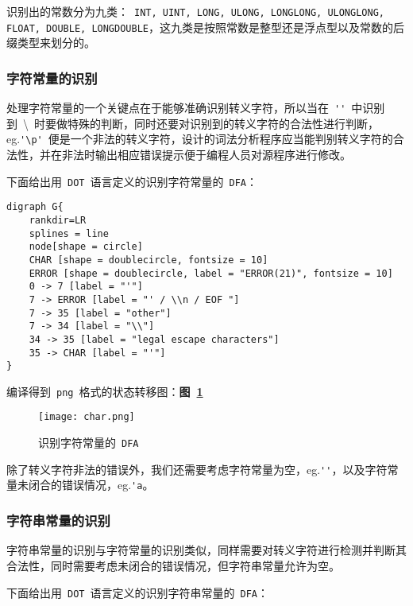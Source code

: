 \documentclass[lang=cn,11pt,a4paper]{paper}
\begin{document}
识别出的常数分为九类：\ \lstinline{INT, UINT, LONG, ULONG, LONGLONG, ULONGLONG, FLOAT, DOUBLE, LONGDOUBLE}，这九类是按照常数是整型还是浮点型以及常数的后缀类型来划分的。

\subsubsection{字符常量的识别}

处理字符常量的一个关键点在于能够准确识别转义字符，所以当在\ \lstinline{''}\ 中识别到\ \textbackslash\ 时要做特殊的判断，同时还要对识别到的转义字符的合法性进行判断，eg.\lstinline{'\p'}\ 便是一个非法的转义字符，设计的词法分析程序应当能判别转义字符的合法性，并在非法时输出相应错误提示便于编程人员对源程序进行修改。

下面给出用\ \lstinline{DOT}\ 语言定义的识别字符常量的\ \lstinline{DFA}：

\begin{lstlisting}
digraph G{
    rankdir=LR
    splines = line
    node[shape = circle]
    CHAR [shape = doublecircle, fontsize = 10]
    ERROR [shape = doublecircle, label = "ERROR(21)", fontsize = 10]
    0 -> 7 [label = "'"]
    7 -> ERROR [label = "' / \\n / EOF "]
    7 -> 35 [label = "other"]
    7 -> 34 [label = "\\"]
    34 -> 35 [label = "legal escape characters"]
    35 -> CHAR [label = "'"]
}
\end{lstlisting}

编译得到\ \lstinline{png}\ 格式的状态转移图：\textbf{图\ \ref{fig:识别字符常量的DFA}}

\begin{figure}[!htb]
    \centering
    \texttt{[image: char.png]}
    \caption{识别字符常量的\ \lstinline{DFA}}
    \label{fig:识别字符常量的DFA}
\end{figure}

除了转义字符非法的错误外，我们还需要考虑字符常量为空，eg.\lstinline{''}，以及字符常量未闭合的错误情况，eg.\lstinline{'a}。

\subsubsection{字符串常量的识别}

字符串常量的识别与字符常量的识别类似，同样需要对转义字符进行检测并判断其合法性，同时需要考虑未闭合的错误情况，但字符串常量允许为空。

下面给出用\ \lstinline{DOT}\ 语言定义的识别字符串常量的\ \lstinline{DFA}：
\end{document}
